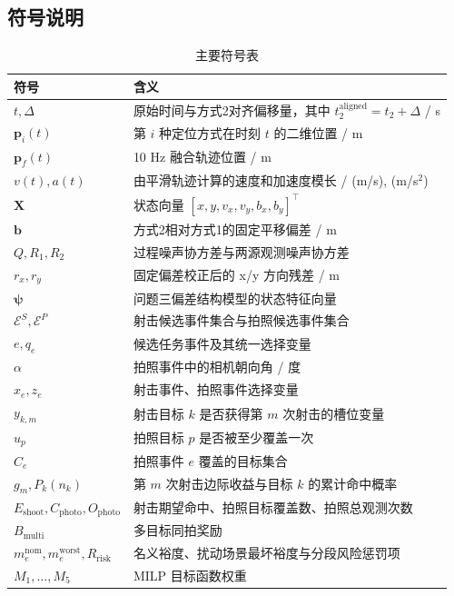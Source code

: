 \documentclass{cumcmthesis}
\begin{document}
\subsection{符号说明}
\begin{table}[H]
  \centering
  \caption{主要符号表}
  \label{tab:symbols}
  \small
  \begin{tabular}{ll}
    \toprule
    符号 & 含义\\
    \midrule
    $t,\Delta$ & 原始时间与方式2对齐偏移量，其中 $t_2^{\mathrm{aligned}}=t_2+\Delta$ / s\\
    $\bm p_i(t)$ & 第 $i$ 种定位方式在时刻 $t$ 的二维位置 / m\\
    $\bm p_f(t)$ & 10 Hz 融合轨迹位置 / m\\
    $v(t),a(t)$ & 由平滑轨迹计算的速度和加速度模长 / (m/s), (m/s$^2$)\\
    $\bm X$ & 状态向量 $[x,y,v_x,v_y,b_x,b_y]^\top$\\
    $\bm b$ & 方式2相对方式1的固定平移偏差 / m\\
    $Q,R_1,R_2$ & 过程噪声协方差与两源观测噪声协方差\\
    $r_x,r_y$ & 固定偏差校正后的 x/y 方向残差 / m\\
    $\boldsymbol{\psi}$ & 问题三偏差结构模型的状态特征向量\\
    $\mathcal E^S,\mathcal E^P$ & 射击候选事件集合与拍照候选事件集合\\
    $e,q_e$ & 候选任务事件及其统一选择变量\\
    $\alpha$ & 拍照事件中的相机朝向角 / 度\\
    $x_e,z_e$ & 射击事件、拍照事件选择变量\\
    $y_{k,m}$ & 射击目标 $k$ 是否获得第 $m$ 次射击的槽位变量\\
    $u_p$ & 拍照目标 $p$ 是否被至少覆盖一次\\
    $C_e$ & 拍照事件 $e$ 覆盖的目标集合\\
    $g_m,P_k(n_k)$ & 第 $m$ 次射击边际收益与目标 $k$ 的累计命中概率\\
    $E_{\mathrm{shoot}},C_{\mathrm{photo}},O_{\mathrm{photo}}$ & 射击期望命中、拍照目标覆盖数、拍照总观测次数\\
    $B_{\mathrm{multi}}$ & 多目标同拍奖励\\
    $m_e^{\mathrm{nom}},m_e^{\mathrm{worst}},R_{\mathrm{risk}}$ & 名义裕度、扰动场景最坏裕度与分段风险惩罚项\\
    $M_1,\ldots,M_5$ & MILP 目标函数权重\\
    \bottomrule
  \end{tabular}
\end{table}
\end{document}
